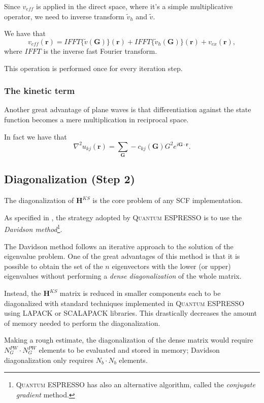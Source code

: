 \documentclass[a4paper,12pt]{article}
\newcommand\mf[1]{\mathbf{#1}}
\newcommand\erre{\mathbf{r}}
\newcommand\GI{\mathbf{G}}
\newcommand\QE{\textsc{Quantum} ESPRESSO }
\begin{document}
Since $v_{eff}$ is applied in the direct space, where it's a simple multiplicative operator, we need to inverse transform $\tilde{v}_{h}$ and $\tilde{v}$.

We have that
\begin{equation}
	v_{eff}(\erre) = IFFT\{\tilde{v}(\mf{G})\}(\erre) + IFFT\{\tilde{v}_{h}(\mf{G})\}(\erre) + v_{ex}(\erre),
\end{equation}
where $IFFT$ is the inverse fast Fourier transform.

This operation is performed once for every iteration step.

\subsubsection{The kinetic term}\label{sec:KineticTerm}

Another great advantage of plane waves is that differentiation against the state function becomes a mere multiplication in reciprocal space.

In fact we have that 
\begin{equation}
	\nabla^2 u_{kj}(\erre) = \sum_{\mf{G}} - c_{kj}(\mf{G})  G^2  e^{i \GI  \cdot \erre}.
\end{equation}


\subsection{Diagonalization (Step 2)}
The diagonalization of $\mf{H}^{KS}$ is the core problem of any SCF implementation.

As specified in \cite[Appendix A.2]{QE}, the strategy adopted by \QE is to use the \textit{Davidson method}\cite{Davidson}\footnote{\QE has also an alternative algorithm, called the \textit{conjugate gradient} method.}.

The Davidson method follows an iterative approach to the solution of the eigenvalue problem.
One of the great advantages of this method is that it is possible to obtain the set of the $n$ eigenvectors with the lower (or upper) eigenvalues without performing a \textit{dense diagonalization} of the whole matrix.

Instead, the $\mf{H}^{KS}$ matrix is reduced in smaller components each to be diagonalized with standard techniques implemented in \QE using LAPACK or SCALAPACK libraries. 
This drastically decreases the amount of memory needed to perform the diagonalization.

Making a rough estimate, the diagonalization of the dense matrix would require $N_{G}^{PW} \cdot N_{G}^{PW}$ elements to be evaluated and stored in memory; Davidson diagonalization only requires $N_{b} \cdot N_{b}$ elements.
\end{document}
